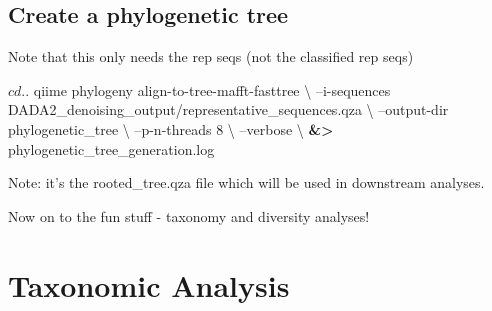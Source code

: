 \documentclass[]{book}
\newenvironment{Shaded}{\begin{snugshade}}{\end{snugshade}}
\newcommand{\BuiltInTok}[1]{#1}
\newcommand{\CommentTok}[1]{\textcolor[rgb]{0.56,0.35,0.01}{\textit{#1}}}
\newcommand{\ExtensionTok}[1]{#1}
\newcommand{\FunctionTok}[1]{\textcolor[rgb]{0.00,0.00,0.00}{#1}}
\newcommand{\NormalTok}[1]{#1}
\newcommand{\OperatorTok}[1]{\textcolor[rgb]{0.81,0.36,0.00}{\textbf{#1}}}
\begin{document}
\begin{Shaded}
\end{Shaded}

\hypertarget{create-a-phylogenetic-tree}{%
\section{Create a phylogenetic tree}\label{create-a-phylogenetic-tree}}

Note that this only needs the rep seqs (not the classified rep seqs)

\begin{Shaded}
\begin{Highlighting}[]
\NormalTok{$ }\BuiltInTok{cd}\NormalTok{ ..}

\NormalTok{$ }\ExtensionTok{qiime}\NormalTok{ phylogeny align-to-tree-mafft-fasttree \textbackslash{}}
\NormalTok{--i-sequences DADA2_denoising_output/representative_sequences.qza \textbackslash{}}
\NormalTok{--output-dir phylogenetic_tree \textbackslash{}}
\NormalTok{--p-n-threads 8 \textbackslash{}}
\NormalTok{--verbose \textbackslash{}}
\OperatorTok{&>}\NormalTok{ phylogenetic_tree_generation.log}
\end{Highlighting}
\end{Shaded}

Note: it's the rooted\_tree.qza file which will be used in downstream analyses.

Now on to the fun stuff - taxonomy and diversity analyses!

\hypertarget{taxonomic-analysis}{%
\chapter{Taxonomic Analysis}\label{taxonomic-analysis}}
\end{document}
